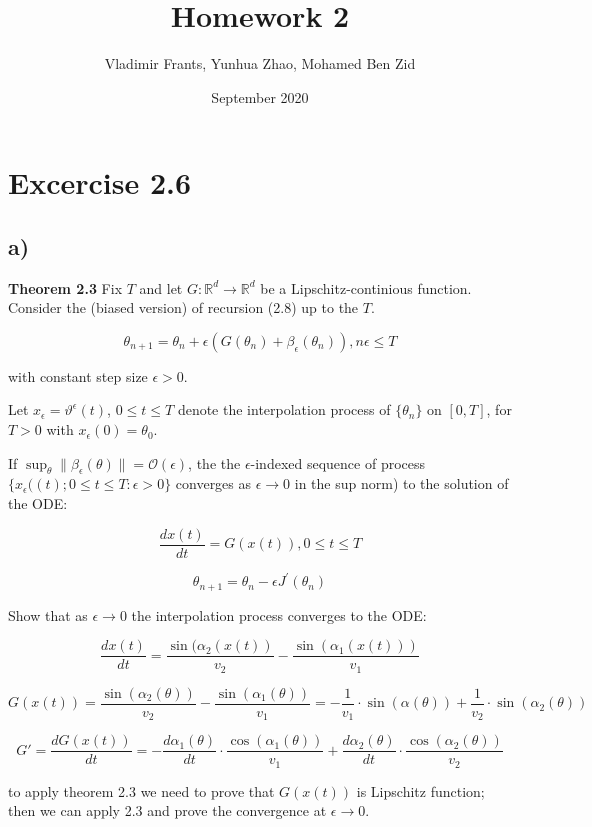 \documentclass{article}
\title{Homework 2}
\author{Vladimir Frants, Yunhua Zhao, Mohamed Ben Zid}
\date{September 2020}
\begin{document}
\maketitle


\section{Excercise 2.6}

\subsection{a)}

\textbf{Theorem 2.3} Fix $T$ and let $G:\mathbb{R}^{d}\rightarrow\mathbb{R}^{d}$ be a Lipschitz-continious function. Consider the (biased version) of recursion (2.8) up to the $T$.

$$\theta_{n+1}=\theta_{n} + \epsilon(G(\theta_{n}) + \beta_{\epsilon}(\theta_{n})), n\epsilon\leq T$$

with constant step size $\epsilon > 0$. 

Let $x_{\epsilon}=\vartheta^{\epsilon}(t)$, $0 \leq t \leq T$ denote the interpolation process of $\{\theta_{n}\}$ on $[0, T]$, for $T>0$ with $x_{\epsilon}(0)=\theta_{0}$.

If $\sup_{\theta}\lVert\beta_{\epsilon}(\theta)\rVert=\mathcal{O}(\epsilon)$, the the $\epsilon$-indexed sequence of process $\{x_{\epsilon}((t); 0 \leq t \leq T: \epsilon > 0\}$ converges as $\epsilon \rightarrow 0$ in the sup norm) to the solution of the ODE:

$$\frac{dx(t)}{dt} = G(x(t)), 0\leq t \leq T$$

$$\theta_{n+1} = \theta_{n} - \epsilon J^{'}(\theta_{n})$$

Show that as $\epsilon\rightarrow 0$ the interpolation process converges to the ODE:

$$\frac{dx(t)}{dt}=\frac{\sin(\alpha_{2}(x(t))}{v_{2}} - \frac{\sin(\alpha_{1}(x(t)))}{v_{1}}$$

$$G(x(t)) = \frac{\sin(\alpha_{2}(\theta))}{v_{2}} - \frac{\sin(\alpha_{1}(\theta))}{v_{1}} = -\frac{1}{v_{1}}\cdot \sin(\alpha(\theta))+\frac{1}{v_2}\cdot \sin(\alpha_{2}(\theta))$$

$$G' = \frac{dG(x(t))}{dt} = -\frac{d\alpha_{1}(\theta)}{dt}\cdot \frac{\cos(\alpha_{1}(\theta))}{v_{1}} + \frac{d\alpha_{2}(\theta)}{dt}\cdot\frac{\cos(\alpha_{2}(\theta))}{v_{2}}$$

to apply theorem 2.3 we need to prove that $G(x(t))$ is Lipschitz function; then we can apply 2.3 and prove the convergence at $\epsilon\rightarrow 0$. 
\end{document}
